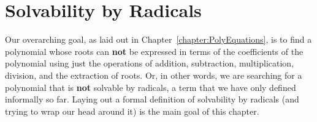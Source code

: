 \chapter{Solvability by Radicals}
\label{chapter:SolvabilityByRadicals}
\thispagestyle{empty}

Our overarching goal, as laid out in Chapter~\ref{chapter:PolyEquations}, is to find a polynomial whose roots can  \textbf{not} be expressed in terms of the coefficients of the polynomial using just the operations of addition, subtraction, multiplication, division, and the extraction of roots. Or, in other words, we are searching for a polynomial that is  \textbf{not} solvable by radicals, a term that we have only defined informally so far. Laying out a formal definition  of solvability by radicals (and trying to wrap our head around it) is the main goal of this chapter.


